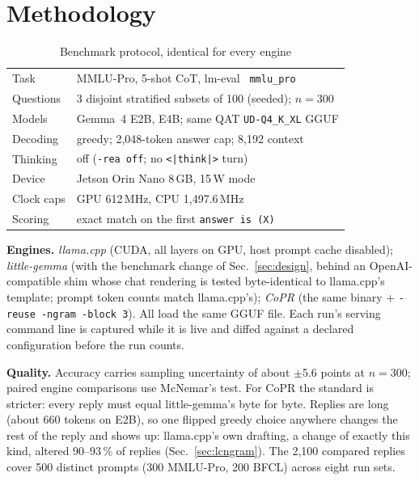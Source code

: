 \documentclass[lettersize,journal]{IEEEtran}
\newcommand{\sys}{CoPR}
\newcommand{\lc}{llama.cpp}
\newcommand{\lgm}{little-gemma}
\begin{document}
\section{Methodology}\label{sec:method}

\begin{table}[t]
\caption{Benchmark protocol, identical for every engine}
\label{tab:protocol}
\centering\footnotesize
\begin{tabular}{@{}ll@{}}
\toprule
Task & MMLU-Pro, 5-shot CoT, lm-eval~\cite{lmeval} \texttt{mmlu\_pro} \\
Questions & 3 disjoint stratified subsets of 100 (seeded); $n{=}300$ \\
Models & Gemma~4 E2B, E4B; same QAT \texttt{UD-Q4\_K\_XL} GGUF \\
Decoding & greedy; 2{,}048-token answer cap; 8{,}192 context \\
Thinking & off (\texttt{-rea off}; no \texttt{<|think|>} turn) \\
Device & Jetson Orin Nano 8\,GB, 15\,W mode \\
Clock caps & GPU 612\,MHz, CPU 1{,}497.6\,MHz \\
Scoring & exact match on the first \texttt{answer is (X)} \\
\bottomrule
\end{tabular}
\end{table}

\textbf{Engines.} \emph{\lc{}} (CUDA, all layers on GPU, host prompt cache
disabled); \emph{\lgm{}} (with the benchmark change of Sec.~\ref{sec:design},
behind an OpenAI-compatible shim whose chat rendering is tested
byte-identical to \lc{}'s template; prompt token counts match \lc{}'s);
\emph{\sys{}} (the same binary + \texttt{-reuse -ngram -block 3}). All load the
same GGUF file. Each run's
serving command line is captured while it is live and diffed against a declared
configuration before the run counts.

\textbf{Quality.} Accuracy carries sampling uncertainty of about $\pm$5.6
points at $n{=}300$; paired engine comparisons use McNemar's test. For \sys{}
the standard is stricter: every reply must equal \lgm{}'s byte for byte. Replies
are long (about 660 tokens on E2B), so one flipped greedy choice anywhere
changes the rest of the reply and shows up: \lc{}'s own drafting, a change of
exactly this kind, altered 90--93\,\% of replies (Sec.~\ref{sec:lcngram}). The
2{,}100 compared replies cover 500 distinct prompts (300 MMLU-Pro, 200 BFCL)
across eight run sets.
\end{document}
